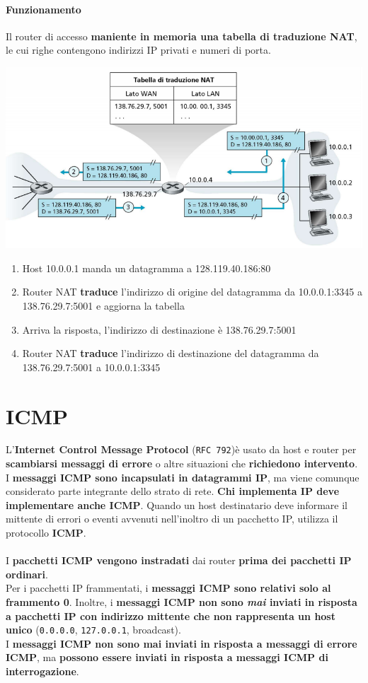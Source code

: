 \documentclass[10pt]{article}
\begin{document}
\paragraph{Funzionamento} Il router di accesso \textbf{maniente in memoria una tabella di traduzione NAT}, le cui righe contengono indirizzi IP privati e numeri di porta.
\begin{center}
\includegraphics[scale=0.7]{nattabella.png}
\end{center}
\begin{enumerate}
\item Host 10.0.0.1 manda un datagramma a 128.119.40.186:80
\item Router NAT \textbf{traduce} l'indirizzo di origine del datagramma da 10.0.0.1:3345 a 138.76.29.7:5001 e aggiorna la tabella
\item Arriva la risposta, l'indirizzo di destinazione è 138.76.29.7:5001
\item Router NAT \textbf{traduce} l'indirizzo di destinazione del datagramma da 138.76.29.7:5001 a 10.0.0.1:3345
\end{enumerate}
\pagebreak
\section{ICMP}
L'\textbf{Internet Control Message Protocol} (\texttt{RFC 792})è usato da host e router per \textbf{scambiarsi messaggi di errore} o altre situazioni che \textbf{richiedono intervento}. I \textbf{messaggi ICMP sono incapsulati in datagrammi IP}, ma viene comunque considerato parte integrante dello strato di rete. \textbf{Chi implementa IP deve implementare anche ICMP}. Quando un host destinatario deve informare il mittente di errori o eventi avvenuti nell'inoltro di un pacchetto IP, utilizza il protocollo \textbf{ICMP}.\\\\
I \textbf{pacchetti ICMP vengono instradati} dai router \textbf{prima dei pacchetti IP ordinari}.\\
Per i pacchetti IP frammentati, i \textbf{messaggi ICMP sono relativi solo al frammento 0}. Inoltre, i \textbf{messaggi ICMP non sono \textit{mai} inviati in risposta a pacchetti IP con indirizzo mittente che non rappresenta un host unico} (\texttt{0.0.0.0}, \texttt{127.0.0.1}, broadcast).\\
I \textbf{messaggi ICMP non sono mai inviati in risposta a messaggi di errore ICMP}, ma \textbf{possono essere inviati in risposta a messaggi ICMP di interrogazione}.
\end{document}
